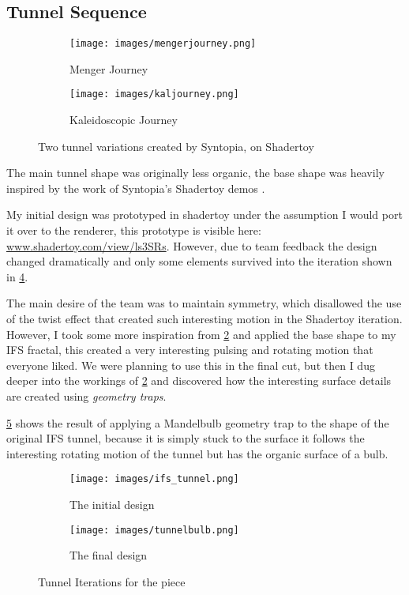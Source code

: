\documentclass[11pt,a4paper,final,notitlepage]{report}
\begin{document}
\subsection{Tunnel Sequence}

\begin{figure}
\centering
\begin{subfigure}{.5\textwidth}
  \centering
  \texttt{[image: images/mengerjourney.png]}
  \caption{Menger Journey \cite{mengerjourney}}
  \label{fig:menger}
\end{subfigure}%
\begin{subfigure}{.5\textwidth}
  \centering
  \texttt{[image: images/kaljourney.png]}
  \caption{Kaleidoscopic Journey \cite{kaljourney}}
  \label{fig:kal}
\end{subfigure}
\caption{Two tunnel variations created by Syntopia, on Shadertoy}
\label{fig:test}
\end{figure}

The main tunnel shape was originally less organic, the base shape was heavily inspired by the work of Syntopia's Shadertoy demos \cite{mengerjourney} \cite{kaljourney}. 

My initial design was prototyped in shadertoy under the assumption I would port it over to the renderer, this prototype is visible here: \url{www.shadertoy.com/view/ls3SRs}. However, due to team feedback the design changed dramatically and only some elements survived into the iteration shown in \ref{fig:initialdesign}.

The main desire of the team was to maintain symmetry, which disallowed the use of the twist effect that created such interesting motion in the Shadertoy iteration. However, I took some more inspiration from \ref{fig:kal} and applied the base shape to my IFS fractal, this created a very interesting pulsing and rotating motion that everyone liked. We were planning to use this in the final cut, but then I dug deeper into the workings of \ref{fig:kal} and discovered how the interesting surface details are created using \textit{geometry traps}.

\ref{fig:finaldesign} shows the result of applying a Mandelbulb geometry trap to the shape of the original IFS tunnel, because it is simply stuck to the surface it follows the interesting rotating motion of the tunnel but has the organic surface of a bulb.

\begin{figure}
\centering
\begin{subfigure}{.5\textwidth}
  \centering
  \texttt{[image: images/ifs\_tunnel.png]}
  \caption{The initial design}
  \label{fig:initialdesign}
\end{subfigure}%
\begin{subfigure}{.5\textwidth}
  \centering
  \texttt{[image: images/tunnelbulb.png]}
  \caption{The final design}
  \label{fig:finaldesign}
\end{subfigure}
\caption{Tunnel Iterations for the piece}
\label{fig:test}
\end{figure}
\end{document}
